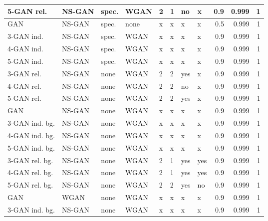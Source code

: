 \documentclass{article}
\begin{document}
\begin{table}[h]
\begin{tabular}{llllllllrrr}
 5-GAN rel. &   NS-GAN &    spec. &    WGAN &      2 &     1 &  no &       x &    0.9 &  0.999 &       1 \\
\midrule
        GAN &   NS-GAN &    spec. &    none &      x &     x &  x &       x &    0.5 &  0.999 &       1 \\
 3-GAN ind. &   NS-GAN &    spec. &    WGAN &      x &     x &  x &       x &    0.9 &  0.999 &       1 \\
 4-GAN ind. &   NS-GAN &    spec. &    WGAN &      x &     x &  x &       x &    0.9 &  0.999 &       1 \\
 5-GAN ind. &   NS-GAN &    spec. &    WGAN &      x &     x &  x &       x &    0.9 &  0.999 &       1 \\
 3-GAN rel. &   NS-GAN &        none &    WGAN &      2 &     2 &   yes &       x &    0.9 &  0.999 &       1 \\
 4-GAN rel. &   NS-GAN &        none &    WGAN &      2 &     2 &  no &       x &    0.9 &  0.999 &       1 \\
 5-GAN rel. &   NS-GAN &        none &    WGAN &      2 &     2 &   yes &       x &    0.9 &  0.999 &       1 \\
\midrule
            GAN &   NS-GAN &        none &    WGAN &      x &     x &  x &       x &    0.9 &  0.999 &       1 \\
 3-GAN ind. bg. &   NS-GAN &        none &    WGAN &      x &     x &  x &        x &    0.9 &  0.999 &       1 \\
 4-GAN ind. bg. &   NS-GAN &        none &    WGAN &      x &     x &  x &        x &    0.9 &  0.999 &       1 \\
 5-GAN ind. bg. &   NS-GAN &        none &    WGAN &      x &     x &  x &       x &    0.9 &  0.999 &       1 \\
 3-GAN rel. bg. &   NS-GAN &        none &    WGAN &      2 &     1 &   yes &        yes &    0.9 &  0.999 &       1 \\
 4-GAN rel. bg. &   NS-GAN &        none &    WGAN &      2 &     1 &   yes &        yes &    0.9 &  0.999 &       1 \\
 5-GAN rel. bg. &   NS-GAN &        none &    WGAN &      2 &     2 &   yes &       no &    0.9 &  0.999 &       1 \\
\midrule
            GAN &     WGAN &        none &    WGAN &      x &     x &  x &       x &    0.9 &  0.999 &       1 \\
 3-GAN ind. bg. &   NS-GAN &        none &    WGAN &      x &     x &  x &       x &    0.9 &  0.999 &       1 \\

\end{tabular}
\end{table}
\end{document}

